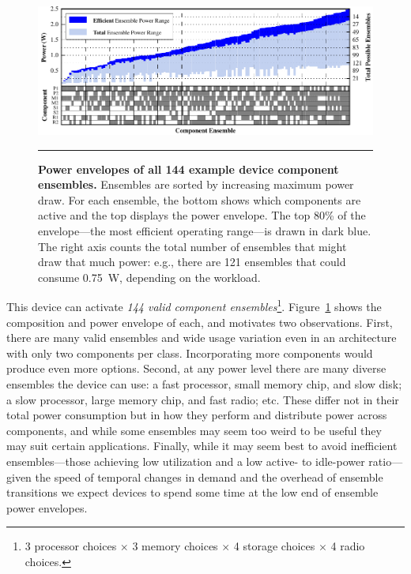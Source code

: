 \begin{figure}[t]
\includegraphics{./figures/componentgraph.pdf}

\caption{\small \textbf{Power envelopes of all 144 example device component
ensembles.} Ensembles are sorted by increasing maximum power draw. For each
ensemble, the bottom shows which components are active and the top displays
the power envelope. The top 80\% of the envelope---the most efficient
operating range---is drawn in dark blue. The right axis counts the total
number of ensembles that might draw that much power: e.g., there are 121
ensembles that could consume 0.75~W, depending on the workload.}

\vspace{0.10in}
\hrule
\vspace{-0.20in}
\label{figure-componentgraph}
\end{figure}


This device can activate \textit{144 valid component ensembles}\footnote{3
processor choices $\times$ 3 memory choices $\times$ 4 storage choices
$\times$ 4 radio choices.}. Figure~\ref{figure-componentgraph} shows the
composition and power envelope of each, and motivates two observations.
First, there are many valid ensembles and wide usage variation even in an
architecture with only two components per class. Incorporating more
components would produce even more options. Second, at any power level there
are many diverse ensembles the device can use: a fast processor, small memory
chip, and slow disk; a slow processor, large memory chip, and fast radio;
etc. These differ not in their total power consumption but in how they
perform and distribute power across components, and while some ensembles may
seem too weird to be useful they may suit certain applications. Finally,
while it may seem best to avoid inefficient ensembles---those achieving low
utilization and a low active- to idle-power ratio---given the speed of
temporal changes in demand and the overhead of ensemble transitions we expect
devices to spend some time at the low end of ensemble power envelopes.
